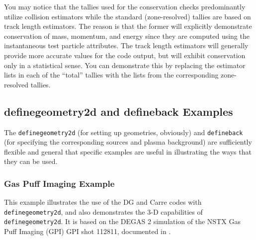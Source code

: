 \documentclass[12pt]{report}
\begin{document}
\begin{enumerate}
You may notice that the tallies used for the conservation checks 
predominantly utilize collision estimators while the standard (zone-resolved)
tallies are based on track length estimators.  The reason is that the
former will explicitly demonstrate conservation of mass, momentum, and
energy since they are computed using the instantaneous test particle
attributes. The track length estimators will generally provide more
accurate values for the code output, but will exhibit conservation only
in a statistical sense.  You can demonstrate this by replacing the
estimator lists in each of the ``total'' tallies with the lists from the
corresponding zone-resolved tallies.
\end{enumerate}

\subsection{definegeometry2d and defineback Examples}
\label{defexamples}

The {\tt definegeometry2d} (for setting up geometries, obviously)
and {\tt defineback} (for specifying the corresponding sources
and plasma background) are sufficiently flexible and general
that specific examples are useful in illustrating the ways that
they can be used.

\subsubsection{Gas Puff Imaging Example}
\label{HeGPI}

This example illustrates the use of the DG and Carre codes
with {\tt definegeometry2d}, and also demonstrates the 3-D
capabilities of {\tt definegeometry2d}.  
It is based on the DEGAS 2 simulation of the NSTX
Gas Puff Imaging (GPI) GPI shot 112811, documented in 
\cite{Stot2007}.
\end{document}
